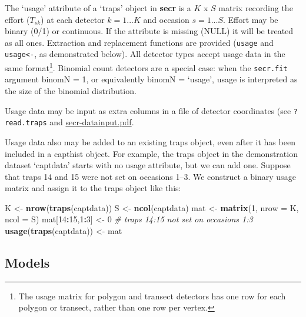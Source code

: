 \documentclass[
]{book}
\newenvironment{Shaded}{\begin{snugshade}}{\end{snugshade}}
\newcommand{\AttributeTok}[1]{\textcolor[rgb]{0.13,0.29,0.53}{#1}}
\newcommand{\CommentTok}[1]{\textcolor[rgb]{0.56,0.35,0.01}{\textit{#1}}}
\newcommand{\DecValTok}[1]{\textcolor[rgb]{0.00,0.00,0.81}{#1}}
\newcommand{\FunctionTok}[1]{\textcolor[rgb]{0.13,0.29,0.53}{\textbf{#1}}}
\newcommand{\NormalTok}[1]{#1}
\newcommand{\OtherTok}[1]{\textcolor[rgb]{0.56,0.35,0.01}{#1}}
\newcommand{\SpecialCharTok}[1]{\textcolor[rgb]{0.81,0.36,0.00}{\textbf{#1}}}
\begin{document}
The `usage' attribute of a `traps' object in \textbf{secr} is a \(K\) x \(S\) matrix recording the effort (\(T_{sk}\)) at each detector \(k = 1...K\) and occasion \(s = 1...S\). Effort may be binary (0/1) or continuous. If the attribute is missing (NULL) it will be treated as all ones. Extraction and replacement functions are provided (\texttt{usage} and \texttt{usage\textless{}-}, as demonstrated below). All detector types accept usage data in the same format\footnote{The usage matrix for polygon and transect detectors has one row for each polygon or transect, rather than one row per vertex.}. Binomial count detectors are a special case: when the \texttt{secr.fit} argument binomN = 1, or equivalently binomN = `usage', usage is interpreted as the size of the binomial distribution.

Usage data may be input as extra columns in a file of detector coordinates (see \texttt{?read.traps} and \href{https://www.otago.ac.nz/density/pdfs/secr-datainput.pdf}{secr-datainput.pdf}.

Usage data also may be added to an existing traps object, even after it has been included in a capthist object. For example, the traps object in the demonstration dataset `captdata' starts with no usage attribute, but we can add one. Suppose that traps 14 and 15 were not set on occasions 1--3. We construct a binary usage matrix and assign it to the traps object like this:

\begin{Shaded}
\begin{Highlighting}[]
\NormalTok{K }\OtherTok{\textless{}{-}} \FunctionTok{nrow}\NormalTok{(}\FunctionTok{traps}\NormalTok{(captdata))}
\NormalTok{S }\OtherTok{\textless{}{-}} \FunctionTok{ncol}\NormalTok{(captdata)}
\NormalTok{mat }\OtherTok{\textless{}{-}} \FunctionTok{matrix}\NormalTok{(}\DecValTok{1}\NormalTok{, }\AttributeTok{nrow =}\NormalTok{ K, }\AttributeTok{ncol =}\NormalTok{ S)}
\NormalTok{mat[}\DecValTok{14}\SpecialCharTok{:}\DecValTok{15}\NormalTok{,}\DecValTok{1}\SpecialCharTok{:}\DecValTok{3}\NormalTok{] }\OtherTok{\textless{}{-}} \DecValTok{0}   \CommentTok{\# traps 14:15 not set on occasions 1:3}
\FunctionTok{usage}\NormalTok{(}\FunctionTok{traps}\NormalTok{(captdata)) }\OtherTok{\textless{}{-}}\NormalTok{ mat}
\end{Highlighting}
\end{Shaded}

\subsection{Models}\label{models}
\end{document}
